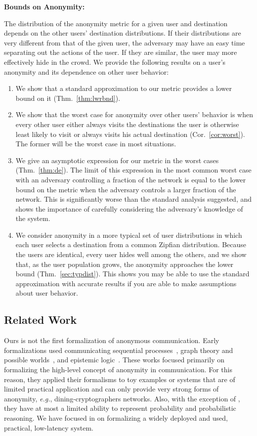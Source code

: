 \documentclass[prodmode,acmtissec]{acmsmall}
\begin{document}
{\bf Bounds on Anonymity:}

The distribution of the anonymity metric for a given user and destination depends on the other users' destination distributions.  If their distributions are very different from that of the given user, the adversary may have an easy time separating out the actions of the user.  If they are similar, the user may more effectively hide in the crowd. We provide the following results on a user's anonymity and its dependence on other user behavior:

\begin{enumerate}
\item We show that a standard approximation to our metric
provides a lower bound on it (Thm.~\ref{thm:lwrbnd}).
\item We show that the worst case for anonymity over other users' behavior is
when every other user either always visits the destinations the user
is otherwise least likely to visit or always visits his actual
destination (Cor.~\ref{cor:worst}). The former will be the worst case in most situations.
\item We give an asymptotic expression for our metric in the worst cases (Thm.~\ref{thm:de}). The limit of this expression in the 
most common worst case with an adversary controlling a fraction  of the network is equal to the lower bound on the metric when the adversary controls a larger fraction  of the network. This is significantly worse than the standard analysis suggested, and shows the importance of carefully considering the adversary's knowledge of the system.
\item We consider anonymity in a more typical set of user distributions in which each user selects a destination from a common Zipfian distribution.  Because the users are identical, every user hides well among the others, and we show that, as the user population grows, the anonymity approaches the lower bound (Thm.~\ref{sec:typdist}). This shows you may be able to use the standard approximation with accurate results if you are able to make assumptions about user behavior.
\end{enumerate}

\subsection{Related Work}

Ours is not the first formalization of anonymous communication. Early formalizations used communicating sequential processes~\cite{schneider96}, graph theory and possible worlds~\cite{modular-approach}, and epistemic logic~\cite{GROUP,halpern-oneill-2003}.  These works focused primarily on formalizing the high-level concept of anonymity in communication. For this reason, they applied their formalisms to toy examples or systems that are of limited practical application and can only provide very strong forms of anonymity, \emph{e.g.}, dining-cryptographers networks.  Also, with the exception of , they have at most a limited ability to represent probability and probabilistic reasoning. We have focused in  on formalizing a widely deployed and used, practical, low-latency system.
\end{document}
